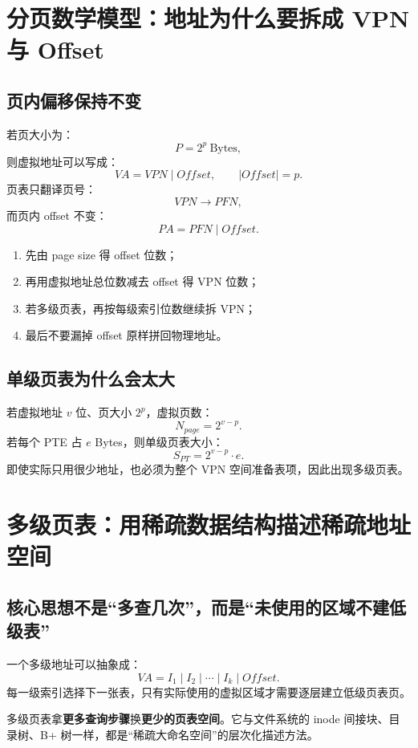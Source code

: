 \documentclass[11pt,a4paper]{ctexart}
\newcommand{\kw}[1]{\textbf{#1}}
\begin{document}
\section{分页数学模型：地址为什么要拆成 VPN 与 Offset}

\subsection{页内偏移保持不变}
若页大小为：
\[
P=2^p\ \text{Bytes},
\]
则虚拟地址可以写成：
\[
\boxed{VA=VPN\mid Offset},\qquad |Offset|=p.
\]
页表只翻译页号：
\[
VPN\to PFN,
\]
而页内 offset 不变：
\[
\boxed{PA=PFN\mid Offset}.
\]

\begin{method}[地址题第一反应]
\begin{enumerate}
  \item 先由 page size 得 offset 位数；
  \item 再用虚拟地址总位数减去 offset 得 VPN 位数；
  \item 若多级页表，再按每级索引位数继续拆 VPN；
  \item 最后不要漏掉 offset 原样拼回物理地址。
\end{enumerate}
\end{method}

\subsection{单级页表为什么会太大}
若虚拟地址 $v$ 位、页大小 $2^p$，虚拟页数：
\[
N_{page}=2^{v-p}.
\]
若每个 PTE 占 $e$ Bytes，则单级页表大小：
\[
S_{PT}=2^{v-p}\cdot e.
\]
即使实际只用很少地址，也必须为整个 VPN 空间准备表项，因此出现多级页表。

\section{多级页表：用稀疏数据结构描述稀疏地址空间}

\subsection{核心思想不是“多查几次”，而是“未使用的区域不建低级表”}
一个多级地址可以抽象成：
\[
VA=I_1\mid I_2\mid\cdots\mid I_k\mid Offset.
\]
每一级索引选择下一张表，只有实际使用的虚拟区域才需要逐层建立低级页表页。

\begin{bridge}
多级页表拿\kw{更多查询步骤}换\kw{更少的页表空间}。它与文件系统的 inode 间接块、目录树、B+ 树一样，都是“稀疏大命名空间”的层次化描述方法。
\end{bridge}
\end{document}
